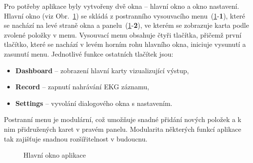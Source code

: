 Pro potřeby aplikace byly vytvořeny dvě okna -- hlavní okno a okno nastavení.
Hlavní okno (viz Obr.~\ref{fig:app_main_window}) se skládá z postranního
vysouvacího menu~(\ref{fig:app_main_window}-\textbf{1}), které se nachází na
levé straně okna a panelu~(\ref{fig:app_main_window}-\textbf{2}), ve kterém se
zobrazuje karta podle zvolené položky v menu. Vysouvací menu obsahuje čtyři
tlačítka, přičemž první tlačítko, které se nachází v levém horním rohu hlavního
okna, iniciuje vysunutí a zasunutí menu. Jednotlivé funkce ostatních tlačítek
jsou:
\begin{itemize}[noitemsep]
    \item \textbf{Dashboard} -- zobrazení hlavní karty vizualizující výstup,
    \item \textbf{Record} -- zapnutí nahrávání EKG záznamu,
    \item \textbf{Settings} -- vyvolání dialogového okna s nastavením.
\end{itemize}
Postranní menu je modulární, což umožňuje snadné přidání nových položek a k nim
přidružených karet v pravém panelu. Modularita některých funkcí aplikace tak
zajišťuje snadnou rozšířitelnost v budoucnu.

\begin{figure}[h]
    \begin{center}
        \textcolor{cyan}{\fboxrule=0.5pt\fboxsep=0pt}
        \caption{Hlavní okno aplikace}
        \label{fig:app_main_window}
    \end{center}
\end{figure}

